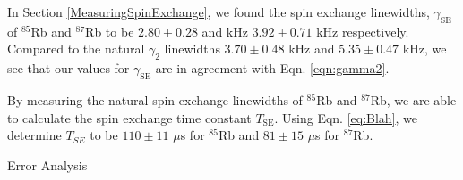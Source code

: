 In Section \ref{MeasuringSpinExchange}, we found the spin exchange linewidths, $\gamma_{\mathrm{SE}}$ of $^{85}$Rb and $^{87}$Rb to be $2.80 \pm 0.28$ and kHz $3.92 \pm 0.71$ kHz respectively. Compared to the natural $\gamma_2$ linewidths $3.70 \pm 0.48$  kHz  and $5.35 \pm 0.47$ kHz, we see that our values for $\gamma_{\mathrm{SE}}$ are in agreement with Eqn. \ref{eqn:gamma2}.

By measuring the natural spin exchange linewidths of $^{85}$Rb and $^{87}$Rb, we are able to calculate the spin exchange time constant $T_{\mathrm{SE}}$.  Using Eqn. \ref{eq:Blah}, we determine $T_{SE}$ to be $110 \pm 11$ $\mu$s for  $^{85}$Rb and $81 \pm 15$ $\mu$s for  $^{87}$Rb. 


Error Analysis